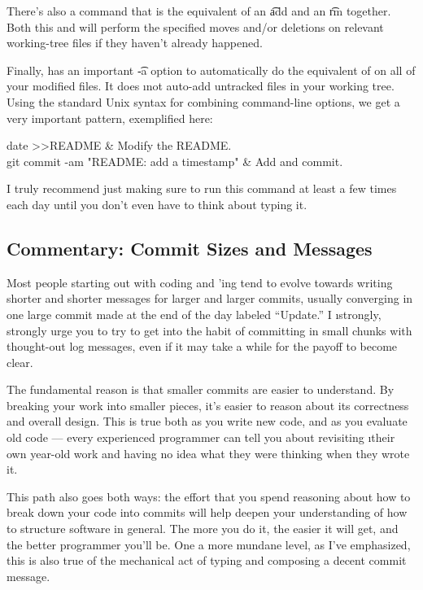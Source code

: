 \documentclass[letterpaper,12pt,titlepage,twoside]{article}
\begin{document}
There's also a  command that is the equivalent of an \t{add} and an
\t{rm} together. Both this and  will perform the specified moves
and/or deletions on relevant working-tree files if they haven't already
happened.

Finally,  has an important \t{-a} option to automatically do the
equivalent of  on all of your modified files. It does \i{not}
auto-add untracked files in your working tree. Using the standard Unix syntax
for combining command-line options, we get a very important pattern,
exemplified here:

\begin{typeme}
date >>README & Modify the README. \\
git commit -am "README: add a timestamp" & Add and commit.
\end{typeme}

I truly recommend just making sure to run this command at least a few times
each day until you don't even have to think about typing it.

\subsection*{Commentary: Commit Sizes and Messages}

Most people starting out with coding and \git'ing tend to evolve towards
writing shorter and shorter messages for larger and larger commits, usually
converging in one large commit made at the end of the day labeled ``Update.''
I \i{strongly, strongly urge} you to try to get into the habit of committing
in small chunks with thought-out log messages, even if it may take a while for
the payoff to become clear.

The fundamental reason is that smaller commits are easier to understand. By
breaking your work into smaller pieces, it's easier to reason about its
correctness and overall design. This is true both as you write new code, and
as you evaluate old code --- every experienced programmer can tell you about
revisiting \i{their own} year-old work and having no idea what they were
thinking when they wrote it.

This path also goes both ways: the effort that you spend reasoning about how
to break down your code into commits will help deepen your understanding of
how to structure software in general. The more you do it, the easier it will
get, and the better programmer you'll be. One a more mundane level, as I've
emphasized, this is also true of the mechanical act of typing
 and composing a decent commit message.
\end{document}
